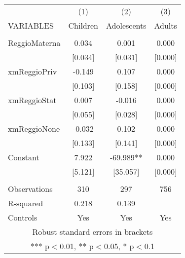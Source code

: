 \begin{tabular}{lccc} \hline
 & (1) & (2) & (3) \\
VARIABLES & Children & Adolescents & Adults \\ \hline
 &  &  &  \\
ReggioMaterna & 0.034 & 0.001 & 0.000 \\
 & [0.034] & [0.031] & [0.000] \\
xmReggioPriv & -0.149 & 0.107 & 0.000 \\
 & [0.103] & [0.158] & [0.000] \\
xmReggioStat & 0.007 & -0.016 & 0.000 \\
 & [0.055] & [0.028] & [0.000] \\
xmReggioNone & -0.032 & 0.102 & 0.000 \\
 & [0.133] & [0.141] & [0.000] \\
Constant & 7.922 & -69.989** & 0.000 \\
 & [5.121] & [35.057] & [0.000] \\
 &  &  &  \\
Observations & 310 & 297 & 756 \\
R-squared & 0.218 & 0.139 &  \\
 Controls & Yes & Yes & Yes \\ \hline
\multicolumn{4}{c}{ Robust standard errors in brackets} \\
\multicolumn{4}{c}{ *** p$<$0.01, ** p$<$0.05, * p$<$0.1} \\
\end{tabular}

